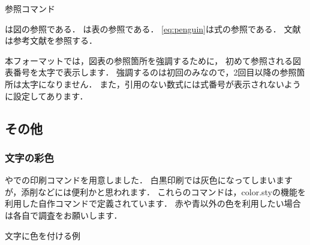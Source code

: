 \begin{lstbox}{参照コマンド}
\begin{minilst}
は図の参照である．
は表の参照である．
\eqref{eq:penguin}は式の参照である．
文献\Cite{penguin}は参考文献を参照する\cite{penguin}．
\end{minilst}
\end{lstbox}

本フォーマットでは，図表の参照箇所を強調するために，
初めて参照される図表番号を太字で表示します．
強調するのは初回のみなので，2回目以降の参照箇所は太字になりません．
また，引用のない数式には式番号が表示されないように設定してあります．

\subsection{その他}

\subsubsection{文字の彩色}
やでの印刷コマンドを用意しました．
白黒印刷では灰色になってしまいますが，添削などには便利かと思われます．
これらのコマンドは，color.styの機能を利用した自作コマンドで定義されています．
赤や青以外の色を利用したい場合は各自で調査をお願いします．
\begin{lstbox}{文字に色を付ける例}
\begin{minilst}
\end{minilst}
\end{lstbox}


